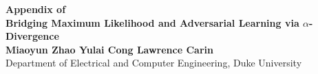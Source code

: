 \documentclass[letterpaper]{article} %
\begin{document}
\fontsize{9.0pt}{10.0pt}\selectfont




\normalsize
\newpage
\appendix


\begin{center}
	\large{\textbf{Appendix of\\
			Bridging Maximum Likelihood and Adversarial Learning via $\alpha$-Divergence}}
	\\
	 \vspace{0.5 cm}
		{\small 
			\textbf{
				Miaoyun Zhao
				\qquad
				Yulai Cong
				\qquad
				Lawrence Carin}
			\\
			Department of Electrical and Computer Engineering, Duke University
		}
\end{center}

\normalsize
\end{document}
